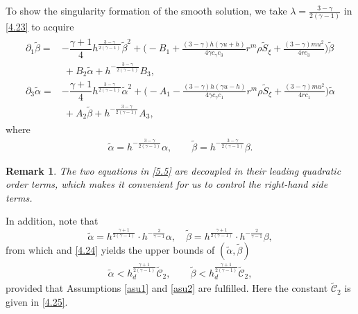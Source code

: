 \documentclass[11pt,reqno]{article}
\newtheorem{rem}{Remark}
\newcommand{\fr}{\frac}
\newcommand{\pa}{\partial}
\numberwithin{equation}{section}
\begin{document}
To show the singularity formation of the smooth solution, we take $\lambda=\fr{3-\gamma}{2(\gamma-1)}$ in \eqref{4.23} to acquire
\begin{align}\label{5.5}
\begin{split}
\pa_1 \tilde\beta =&-\dfrac{\gamma+1}{4}h^{\fr{3-\gamma}{2(\gamma-1)}} \tilde{\beta}^{2}
   +\Big(-B_{1}+\fr{(3-\gamma)h(\gamma u+h)}{4\gamma c_\gamma c_3}r^m\rho \widetilde{S}_\xi   +\fr{(3-\gamma)mu^2}{4rc_3} \Big)\tilde\beta \\
&\ + B_{2} \tilde\alpha +h^{-\fr{3-\gamma}{2(\gamma-1)}}B_3, \\[4pt]
\pa_3 \tilde\alpha =&-\dfrac{\gamma+1}{4}h^{\fr{3-\gamma}{2(\gamma-1)}} \tilde{\alpha}^{2}
  +\Big(-A_{1}-\fr{(3-\gamma)h(\gamma u-h)}{4\gamma c_\gamma c_1}r^m\rho \widetilde{S}_\xi  +\fr{(3-\gamma)mu^2}{4rc_1} \Big)\tilde\alpha \\
&\ + A_{2} \tilde\beta +h^{-\fr{3-\gamma}{2(\gamma-1)}}A_3,
\end{split}
\end{align}
where
\begin{align}\label{5.6}
\tilde\alpha =h^{-\fr{3-\gamma}{2(\gamma-1)}}\alpha,\qquad \tilde\beta =h^{-\fr{3-\gamma}{2(\gamma-1)}}\beta.
\end{align}
\begin{rem}\label{r7}
The two equations in \eqref{5.5} are decoupled in their leading quadratic order terms, which makes it convenient for us to control the right-hand side terms.
\end{rem}
In addition, note that
$$
\tilde\alpha=h^{\fr{\gamma+1}{2(\gamma-1)}}\cdot h^{-\fr{2}{\gamma-1}}\alpha,\quad \tilde\beta=h^{\fr{\gamma+1}{2(\gamma-1)}}\cdot h^{-\fr{2}{\gamma-1}}\beta,
$$
from which and \eqref{4.24} yields the upper bounds of $(\tilde\alpha, \tilde\beta)$
\begin{align}\label{a7}
\tilde\alpha< h_{d}^{\fr{\gamma+1}{2(\gamma-1)}}\widetilde{\mathcal{C}}_2,\qquad \tilde\beta< h_{d}^{\fr{\gamma+1}{2(\gamma-1)}}\widetilde{\mathcal{C}}_2,
\end{align}
provided that Assumptions \ref{asu1} and \ref{asu2} are fulfilled. Here the constant $\widetilde{\mathcal{C}}_2$ is given in \eqref{4.25}.
\end{document}
